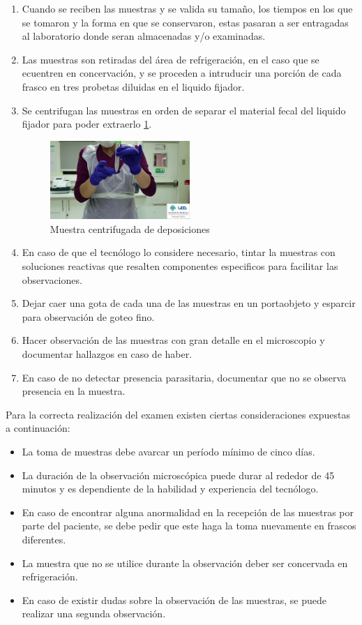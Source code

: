 \documentclass[letter,12pt]{report}
\begin{document}
\begin{enumerate}
    \item Cuando se reciben las muestras y se valida su tamaño, los tiempos en los que se
        tomaron y la forma en que se conservaron, estas pasaran a ser entragadas al
        laboratorio donde seran almacenadas y/o examinadas.
    \item Las muestras son retiradas del área de refrigeración, en el caso que se
        ecuentren en concervación, y se proceden a intruducir una porción de cada frasco
        en tres probetas diluidas en el liquido fijador.
    \item Se centrifugan las muestras en orden de separar el material fecal del liquido
        fijador para poder extraerlo \ref{fig:sample}.
        \begin{figure}[H]
            \centering
            \includegraphics[width=0.5\textwidth]{sample}
            \caption{Muestra centrifugada de deposiciones}
            \label{fig:sample}
        \end{figure}
    \item En caso de que el tecnólogo lo considere necesario, tintar la muestras con
        soluciones reactivas que resalten componentes especificos para facilitar las
        observaciones.
    \item Dejar caer una gota de cada una de las muestras en un portaobjeto y esparcir
        para observación de goteo fino.
    \item Hacer observación de las muestras con gran detalle en el microscopio y
        documentar hallazgos en caso de haber.
    \item En caso de no detectar presencia parasitaria, documentar que no se observa
        presencia en la muestra.
\end{enumerate}

Para la correcta realización del examen existen ciertas consideraciones expuestas a
continuación:
\begin{itemize}
    \item La toma de muestras debe avarcar un período mínimo de cinco días.
    \item La duración de la observación microscópica puede durar al rededor de 45
        minutos y es dependiente de la habilidad y experiencia del tecnólogo.
    \item En caso de encontrar alguna anormalidad en la recepción de las muestras por
        parte del paciente, se debe pedir que este haga la toma nuevamente en frascos
        diferentes.
    \item La muestra que no se utilice durante la observación deber ser concervada en
        refrigeración.
    \item En caso de existir dudas sobre la observación de las muestras, se puede
        realizar una segunda observación.
\end{itemize}
\end{document}
